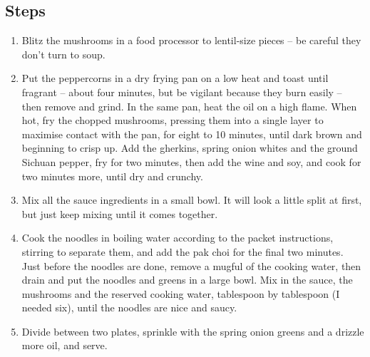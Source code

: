 \documentclass{book}
\begin{document}
\subsection*{Steps}
\begin{enumerate}
\item Blitz the mushrooms in a food processor to lentil-size pieces – be careful they don’t turn to soup. 
\item Put the peppercorns in a dry frying pan on a low heat and toast until fragrant – about four minutes, but be vigilant because they burn easily – then remove and grind. In the same pan, heat the oil on a high flame. When hot, fry the chopped mushrooms, pressing them into a single layer to maximise contact with the pan, for eight to 10 minutes, until dark brown and beginning to crisp up. Add the gherkins, spring onion whites and the ground Sichuan pepper, fry for two minutes, then add the wine and soy, and cook for two minutes more, until dry and crunchy.
\item Mix all the sauce ingredients in a small bowl. It will look a little split at first, but just keep mixing until it comes together.
\item Cook the noodles in boiling water according to the packet instructions, stirring to separate them, and add the pak choi for the final two minutes. Just before the noodles are done, remove a mugful of the cooking water, then drain and put the noodles and greens in a large bowl. Mix in the sauce, the mushrooms and the reserved cooking water, tablespoon by tablespoon (I needed six), until the noodles are nice and saucy.
\item Divide between two plates, sprinkle with the spring onion greens and a drizzle more oil, and serve.
\end{enumerate}
\newpage
\end{document}
